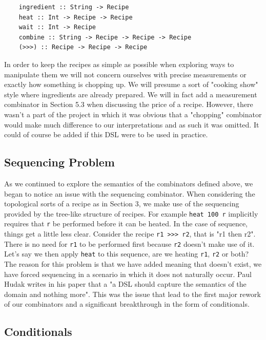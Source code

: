 \documentclass[11pt]{article}
\begin{document}
\begin{lstlisting}
    ingredient :: String -> Recipe
    heat :: Int -> Recipe -> Recipe
    wait :: Int -> Recipe
    combine :: String -> Recipe -> Recipe -> Recipe
    (>>>) :: Recipe -> Recipe -> Recipe
\end{lstlisting}

In order to keep the recipes as simple as possible when exploring ways to manipulate them
we will not concern ourselves with precise measurements or exactly how something is chopping
up. We will presume a sort of "cooking show" style where ingredients are already prepared.
We will in fact add a measurement combinator in Section 5.3 when discussing the price of a recipe.
However, there wasn't a part of the project in which it was obvious that a "chopping" combinator
would make much difference to our interpretations and as such it was omitted. It could of course
be added if this DSL were to be used in practice.

\subsection{Sequencing Problem}

As we continued to explore the semantics of the combinators defined above, we began to
notice an issue with the sequencing combinator. When considering the topological sorts
of a recipe as in Section 3, we make use of the sequencing provided by the tree-like structure
of recipes. For example \texttt{heat 100 r} implicitly requires that \texttt{r} be performed
before it can be heated. In the case of sequence, things get a little less clear. Consider
the recipe \texttt{r1 >>> r2}, that is "r1 then r2". There is no need for \texttt{r1} to be
performed first because \texttt{r2} doesn't make use of it. Let's say we then apply \texttt{heat}
to this sequence, are we heating \texttt{r1}, \texttt{r2} or both? The reason for this problem
is that we have added meaning that doesn't exist, we have forced sequencing in a scenario
in which it does not naturally occur. Paul Hudak writes in his paper \cite{hudak} that a
"a DSL should capture the semantics of the domain and nothing more". This was the issue
that lead to the first major rework of our combinators and a significant breakthrough
in the form of conditionals.

\subsection{Conditionals}
\end{document}
